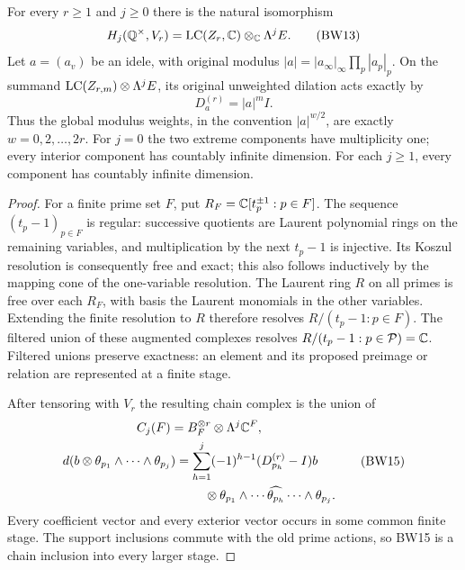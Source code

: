 \begin{theorem}
For every $r\ge1$ and $j\ge0$ there is the natural isomorphism
\[
 H_j(\mathbb Q^\times,V_r)
   =\operatorname{LC}(Z_r,\mathbb C)\otimes_\mathbb C\Lambda^jE.
 \tag{BW13}
\]
Let $a=(a_v)$ be an idele, with original modulus
$|a|=|a_\infty|_\infty\prod_p|a_p|_p$. On the summand
$\operatorname{LC}(Z_{r,m})\otimes\Lambda^jE$, its original unweighted
dilation acts exactly by
\[
 D_a^{(r)}=|a|^m I.
 \tag{BW14}
\]
Thus the global modulus weights, in the convention
$|a|^{w/2}$, are exactly $w=0,2,\ldots,2r$. For $j=0$ the
two extreme components have multiplicity one; every interior
component has countably infinite dimension. For each $j\ge1$,
every component has countably infinite dimension.
\end{theorem}
\begin{proof}
For a finite prime set $F$, put
$R_F=\mathbb C[t_p^{\pm1}:p\in F]$. The sequence $(t_p-1)_{p\in F}$
is regular: successive quotients are Laurent polynomial rings on
the remaining variables, and multiplication by the next $t_p-1$
is injective. Its Koszul resolution is consequently free and exact;
this also follows inductively by the mapping cone of the
one-variable resolution. The Laurent ring $R$ on all primes is free
over each $R_F$, with basis the Laurent monomials in the other
variables. Extending the finite resolution to $R$ therefore resolves
$R/(t_p-1:p\in F)$. The filtered union of these augmented complexes
resolves $R/(t_p-1:p\in\mathcal P)=\mathbb C$. Filtered unions preserve
exactness: an element and its proposed preimage or relation are
represented at a finite stage.

After tensoring with $V_r$ the resulting chain complex is the
union of
\[
 \begin{gathered}
 C_j(F)=B_F^{\otimes r}\otimes\Lambda^j\mathbb C^F,\\
 \begin{aligned}
 d(b\otimes\theta_{p_1}\wedge\cdots\wedge\theta_{p_j})
 &=\sum_{h=1}^j(-1)^{h-1}(D_{p_h}^{(r)}-I)b\\
 &\hspace{8mm}\otimes\theta_{p_1}\wedge\cdots
              \widehat{\theta_{p_h}}\cdots\wedge\theta_{p_j}.
 \end{aligned}
 \end{gathered}
 \tag{BW15}
\]
Every coefficient vector and every exterior vector occurs in some
common finite stage. The support inclusions commute with the old
prime actions, so BW15 is a chain inclusion into every larger stage.


\end{proof}
